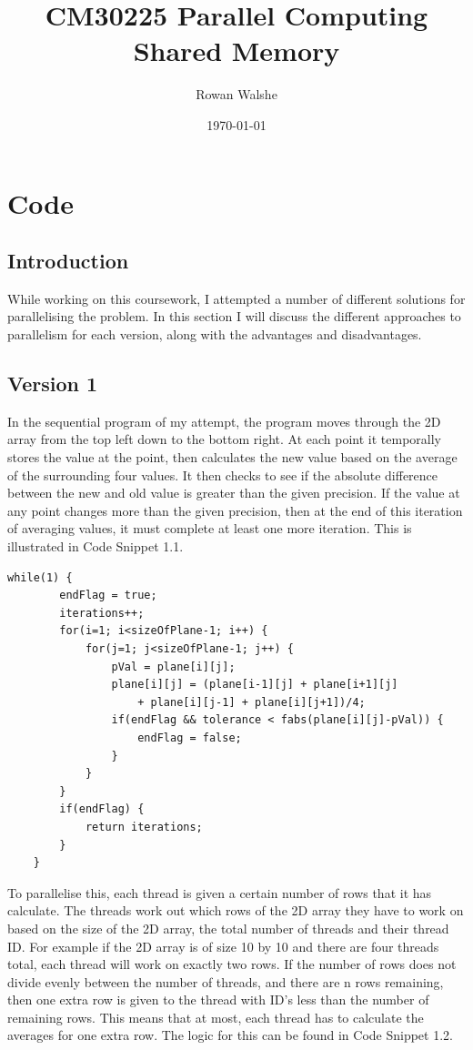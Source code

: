 \documentclass{report}
\title{CM30225 Parallel Computing\\Shared Memory} %
\author{Rowan Walshe} %
\date{\today} %
\begin{document}
\maketitle %
\pagebreak

\chapter{Code}
\section{Introduction}
While working on this coursework, I attempted a number of different solutions for parallelising the problem. In this section I will discuss the different approaches to parallelism for each version, along with the advantages and disadvantages.
\section{Version 1}
In the sequential program of my attempt, the program moves through the 2D array from the top left down to the bottom right. At each point it temporally stores the value at the point, then calculates the new value based on the average of the surrounding four values. It then checks to see if the absolute difference between the new and old value is greater than the given precision. If the value at any point changes more than the given precision, then at the end of this iteration of averaging values, it must complete at least one more iteration. This is illustrated in Code Snippet 1.1.
\begin{lstlisting}[style=customc,caption=Version 1 Sequential Main Loop]
    while(1) {
        endFlag = true;
        iterations++;
        for(i=1; i<sizeOfPlane-1; i++) {
            for(j=1; j<sizeOfPlane-1; j++) {
                pVal = plane[i][j];
                plane[i][j] = (plane[i-1][j] + plane[i+1][j]
                    + plane[i][j-1] + plane[i][j+1])/4;
                if(endFlag && tolerance < fabs(plane[i][j]-pVal)) {
                    endFlag = false;
                }
            }
        }
        if(endFlag) {
            return iterations;
        }
    }
\end{lstlisting}
To parallelise this, each thread is given a certain number of rows that it has calculate. The threads work out which rows of the 2D array they have to work on based on the size of the 2D array, the total number of threads and their thread ID. For example if the 2D array is of size 10 by 10 and there are four threads total, each thread will work on exactly two rows. If the number of rows does not divide evenly between the number of threads, and there are n rows remaining, then one extra row is given to the thread with ID's less than the number of remaining rows. This means that at most, each thread has to calculate the averages for one extra row. The logic for this can be found in Code Snippet 1.2.
\end{document}
